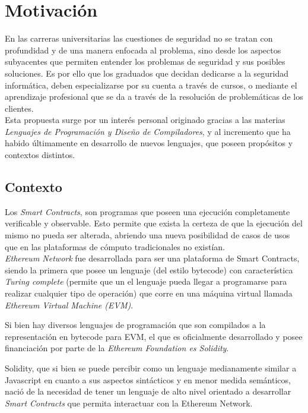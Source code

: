 \section{Motivación}
En las carreras universitarias las cuestiones de seguridad no se tratan con profundidad y de una manera enfocada al problema, sino desde los aspectos subyacentes que permiten entender los problemas de seguridad y sus posibles soluciones.  Es por ello que los graduados que decidan dedicarse a la seguridad informática, deben especializarse por su cuenta a través de cursos, o mediante el aprendizaje profesional que se da a través de la resolución de problemáticas de los clientes.\\

Esta propuesta surge por un interés personal originado gracias a las materias \textit{Lenguajes de Programación y Diseño de Compiladores}, y al incremento que ha habido últimamente en desarrollo de nuevos lenguajes, que poseen propósitos y contextos distintos\cite{Klabnik:2018:RPL:3271463}\cite{Forsgren:2018:ASL:3235404}.

\subsection{Contexto}
Los \textit{Smart Contracts}, son programas que poseen una ejecución completamente verificable y observable. Esto permite que exista la certeza de que la ejecución del mismo no pueda ser alterada, abriendo una nueva posibilidad de casos de usos que en las plataformas de cómputo tradicionales no existían.\\

\textit{Ethereum Network} fue desarrollada para ser una plataforma de Smart Contracts, siendo la primera que posee un lenguaje (del estilo bytecode) con característica \textit{Turing complete} (permite que un el lenguaje pueda llegar a programarse para realizar cualquier tipo de operación) que corre en una máquina virtual llamada \textit{Ethereum Virtual Machine (EVM)}.

Si bien hay diversos lenguajes de programación que son compilados a la representación en bytecode para EVM, el que es oficialmente desarrollado y posee financiación por parte de la \textit{Ethereum Foundation es Solidity}\cite{solidity_readthedocs}.

Solidity, que si bien se puede percibir como un lenguaje medianamente similar a Javascript en cuanto a sus aspectos sintácticos y en menor medida semánticos, nació de la necesidad de tener un lenguaje de alto nivel orientado a desarrollar \textit{Smart Contracts} que permita interactuar con la Ethereum Network. 

